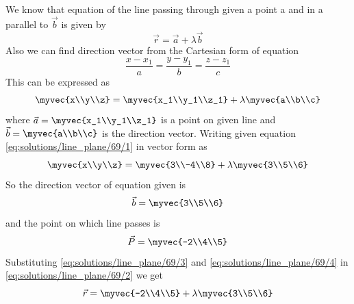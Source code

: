 We know that equation of the line passing through given a point a and in a parallel to $\vec{b}$ is given by
\begin{equation}\label{eq:solutions/line_plane/69/2}
    \vec{r} = \vec{a}+\lambda\vec{b}
\end{equation}
Also we can find direction vector from the Cartesian form of equation
\begin{equation}
    \frac{x-x_1}{a} = \frac{y-y_1}{b} = \frac{z-z_1}{c}
\end{equation}
This can be expressed as
\begin{equation}
    \myvec{x\\y\\z} = \myvec{x_1\\y_1\\z_1} + \lambda\myvec{a\\b\\c}
\end{equation}
where $\vec{a} = \myvec{x_1\\y_1\\z_1}$ is a point on given line and $\vec{b} = \myvec{a\\b\\c}$ is the direction vector.
Writing given equation \eqref{eq:solutions/line_plane/69/1} in vector form as
\begin{equation}
    \myvec{x\\y\\z} = \myvec{3\\-4\\8} + \lambda\myvec{3\\5\\6}
\end{equation}
So the direction vector of equation given is
\begin{equation}\label{eq:solutions/line_plane/69/3}
    \vec{b} = \myvec{3\\5\\6}
\end{equation}
and the point on which line passes is 
\begin{equation}\label{eq:solutions/line_plane/69/4}
   \vec{P} = \myvec{-2\\4\\5} 
\end{equation}
Substituting \eqref{eq:solutions/line_plane/69/3} and \eqref{eq:solutions/line_plane/69/4} in \eqref{eq:solutions/line_plane/69/2} we get
\begin{equation}
    \vec{r} = \myvec{-2\\4\\5} + \lambda \myvec{3\\5\\6}
\end{equation}
